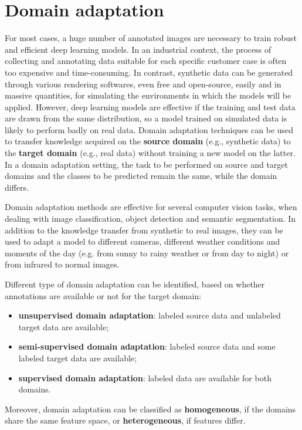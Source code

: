 \documentclass[%
    corpo=12pt,
    twoside,
    stile=classica,   
    tipotesi=magistrale,
    evenboxes,
    english
]{toptesi}
\begin{document}
\section{Domain adaptation}
For most cases, a huge number of annotated images are necessary to train robust and efficient deep learning models. In an industrial context, the process of collecting and annotating data suitable for each specific customer case is often too expensive and time-consuming. In contrast, synthetic data can be generated through various rendering softwares, even free and open-source, easily and in massive quantities, for simulating the environments in which the models will be applied. However, deep learning models are effective if the training and test data are drawn from the same distribution, so a model trained on simulated data is likely to perform badly on real data. Domain adaptation techniques can be used to transfer knowledge acquired on the \textbf{source domain} (e.g., synthetic data) to the \textbf{target domain} (e.g., real data) without training a new model on the latter. In a domain adaptation setting, the task to be performed on source and target domains and the classes to be predicted remain the same, while the domain differs.

Domain adaptation methods are effective for several computer vision tasks, when dealing with image classification, object detection and semantic segmentation. In addition to the knowledge transfer from synthetic to real images, they can be used to adapt a model to different cameras, different weather conditions and moments of the day (e.g. from sunny to rainy weather or from day to night) or from infrared to normal images.

Different type of domain adaptation can be identified, based on whether an\-no\-ta\-tions are available or not for the target domain:

\begin{itemize}
	\item \textbf{unsupervised domain adaptation}: labeled source data and unlabeled target data are available;
	\item \textbf{semi-supervised domain adaptation}: labeled source data and some labeled target data are available;
	\item \textbf{supervised domain adaptation}: labeled data are available for both domains.
\end{itemize}
Moreover, domain adaptation can be classified as \textbf{homogeneous}, if the domains share the same feature space, or \textbf{heterogeneous}, if features differ.
\end{document}
